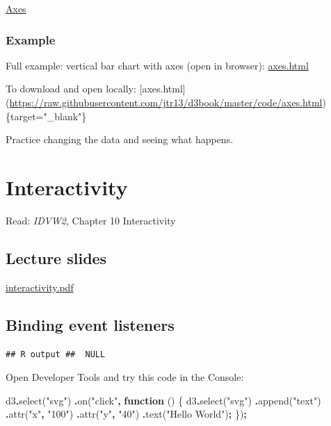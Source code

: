 \documentclass[
  openany]{book}
\newenvironment{Shaded}{\begin{snugshade}}{\end{snugshade}}
\newcommand{\FunctionTok}[1]{\textcolor[rgb]{0.00,0.00,0.00}{#1}}
\newcommand{\KeywordTok}[1]{\textcolor[rgb]{0.13,0.29,0.53}{\textbf{#1}}}
\newcommand{\NormalTok}[1]{#1}
\newcommand{\OperatorTok}[1]{\textcolor[rgb]{0.81,0.36,0.00}{\textbf{#1}}}
\newcommand{\StringTok}[1]{\textcolor[rgb]{0.31,0.60,0.02}{#1}}
\begin{document}
\href{pdfs/axes.pdf}{Axes}

\hypertarget{example-1}{%
\subsection{Example}\label{example-1}}

Full example: vertical bar chart with axes (open in browser): \href{code/axes.html}{axes.html}

To download and open locally: {[}axes.html{]} (\url{https://raw.githubusercontent.com/jtr13/d3book/master/code/axes.html})\{target="\_blank"\}

Practice changing the data and seeing what happens.

\hypertarget{interactivity}{%
\chapter{\texorpdfstring{Interactivity }{Interactivity }}\label{interactivity}}

Read: \emph{IDVW2}, Chapter 10 Interactivity

\hypertarget{lecture-slides-4}{%
\section{\texorpdfstring{Lecture slides }{Lecture slides }}\label{lecture-slides-4}}

\href{pdfs/interactivity.pdf}{interactivity.pdf}

\hypertarget{binding-event-listeners}{%
\section{Binding event listeners}\label{binding-event-listeners}}

\begin{verbatim}
## R output ##  NULL
\end{verbatim}

Open Developer Tools and try this code in the Console:

\begin{Shaded}
\begin{Highlighting}[]
\NormalTok{d3}\OperatorTok{.}\FunctionTok{select}\NormalTok{(}\StringTok{"svg"}\NormalTok{)}
  \OperatorTok{.}\FunctionTok{on}\NormalTok{(}\StringTok{"click"}\OperatorTok{,} \KeywordTok{function}\NormalTok{ () \{}
\NormalTok{    d3}\OperatorTok{.}\FunctionTok{select}\NormalTok{(}\StringTok{"svg"}\NormalTok{)}
      \OperatorTok{.}\FunctionTok{append}\NormalTok{(}\StringTok{"text"}\NormalTok{)}
        \OperatorTok{.}\FunctionTok{attr}\NormalTok{(}\StringTok{"x"}\OperatorTok{,} \StringTok{"100"}\NormalTok{)}
        \OperatorTok{.}\FunctionTok{attr}\NormalTok{(}\StringTok{"y"}\OperatorTok{,} \StringTok{"40"}\NormalTok{)}
        \OperatorTok{.}\FunctionTok{text}\NormalTok{(}\StringTok{"Hello World"}\NormalTok{)}\OperatorTok{;}
\NormalTok{        \})}\OperatorTok{;}
\end{Highlighting}
\end{Shaded}
\end{document}
